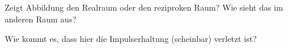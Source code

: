 \begin{questions} 
    \item Zeigt Abbildung %
    den Realraum oder den reziproken Raum?  Wie sieht das im anderen Raum aus?
    \item Wie kommt es, dass hier die Impulserhaltung (scheinbar) verletzt ist?
\end{questions}
     

    


